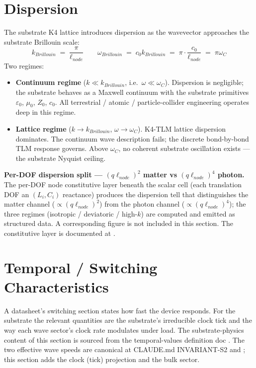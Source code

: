 \section{Dispersion}
\label{sec:vol9_dispersion}

The substrate K4 lattice introduces dispersion as the wavevector approaches the substrate Brillouin scale:
\begin{equation}
k_{Brillouin} \;=\; \frac{\pi}{\ell_{node}} \qquad \omega_{Brillouin} \;=\; c_0 k_{Brillouin} \;=\; \pi \cdot \frac{c_0}{\ell_{node}} \;=\; \pi \omega_C
\end{equation}
Two regimes:

\begin{itemize}
    \item \textbf{Continuum regime} ($k \ll k_{Brillouin}$, i.e.\ $\omega \ll \omega_C$). Dispersion is negligible; the substrate behaves as a Maxwell continuum with the substrate primitives $\varepsilon_0$, $\mu_0$, $Z_0$, $c_0$. All terrestrial / atomic / particle-collider engineering operates deep in this regime.
    \item \textbf{Lattice regime} ($k \to k_{Brillouin}$, $\omega \to \omega_C$). K4-TLM lattice dispersion dominates. The continuum wave description fails; the discrete bond-by-bond TLM response governs. Above $\omega_C$, no coherent substrate oscillation exists --- the substrate Nyquist ceiling.
\end{itemize}

\noindent
\textbf{Per-DOF dispersion split --- $(q\ell_{node})^2$ matter vs $(q\ell_{node})^4$ photon.} The per-DOF node constitutive layer beneath the scalar cell (each translation DOF an $(L_i,C_i)$ reactance) produces the dispersion tell that distinguishes the matter channel ($\propto (q\ell_{node})^2$) from the photon channel ($\propto (q\ell_{node})^4$); the three regimes (isotropic / deviatoric / high-$k$) are computed and emitted as structured data. A corresponding figure is not included in this section. The constitutive layer is documented at .

\section{Temporal / Switching Characteristics}
\label{sec:vol9_temporal_switching}

A datasheet's switching section states how fast the device responds. For the substrate the relevant quantities are the substrate's irreducible clock tick and the way each wave sector's clock rate modulates under load. The substrate-physics content of this section is sourced from the temporal-values definition doc . The two effective wave speeds are canonical at CLAUDE.md INVARIANT-S2 and ; this section adds the clock (tick) projection and the bulk sector.

